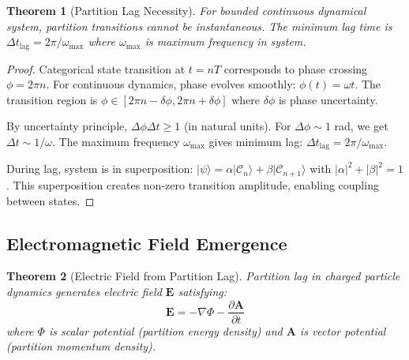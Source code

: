 \documentclass[twocolumn,10pt]{article}
\newtheorem{theorem}{Theorem}[section]
\begin{document}
\begin{theorem}[Partition Lag Necessity]
\label{thm:partition_lag}
For bounded continuous dynamical system, partition transitions cannot be instantaneous. The minimum lag time is $\Delta t_{\text{lag}} = 2\pi/\omega_{\max}$ where $\omega_{\max}$ is maximum frequency in system.
\end{theorem}

\begin{proof}
Categorical state transition at $t = nT$ corresponds to phase crossing $\phi = 2\pi n$. For continuous dynamics, phase evolves smoothly: $\phi(t) = \omega t$. The transition region is $\phi \in [2\pi n - \delta\phi, 2\pi n + \delta\phi]$ where $\delta\phi$ is phase uncertainty.

By uncertainty principle, $\Delta\phi \Delta t \geq 1$ (in natural units). For $\Delta\phi \sim 1$ rad, we get $\Delta t \sim 1/\omega$. The maximum frequency $\omega_{\max}$ gives minimum lag: $\Delta t_{\text{lag}} = 2\pi/\omega_{\max}$.

During lag, system is in superposition: $|\psi\rangle = \alpha|\mathcal{C}_n\rangle + \beta|\mathcal{C}_{n+1}\rangle$ with $|\alpha|^2 + |\beta|^2 = 1$. This superposition creates non-zero transition amplitude, enabling coupling between states.
\end{proof}

\subsection{Electromagnetic Field Emergence}

\begin{theorem}[Electric Field from Partition Lag]
\label{thm:electric_field}
Partition lag in charged particle dynamics generates electric field $\mathbf{E}$ satisfying:
\begin{equation}
\mathbf{E} = -\nabla\Phi - \frac{\partial \mathbf{A}}{\partial t}
\end{equation}
where $\Phi$ is scalar potential (partition energy density) and $\mathbf{A}$ is vector potential (partition momentum density).
\end{theorem}
\end{document}
